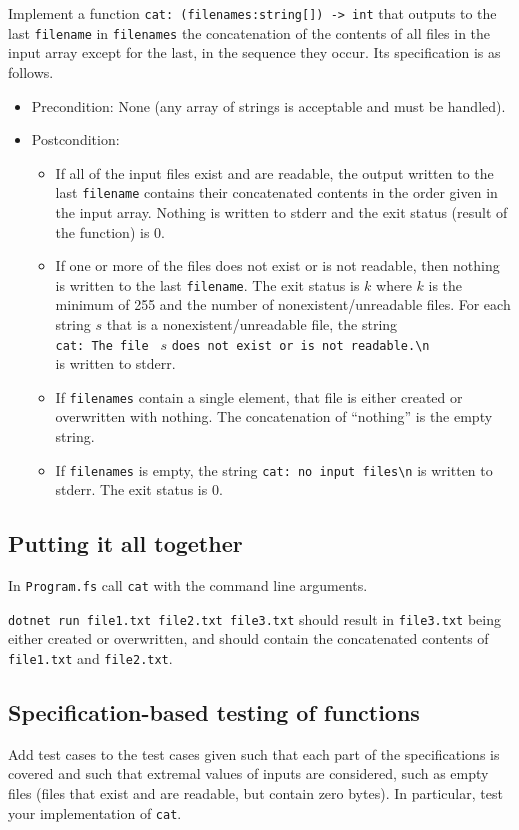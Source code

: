 Implement a function \texttt{cat: (filenames:string[]) -> int} that outputs to the last \texttt{filename} in \texttt{filenames} the concatenation of the contents of all files in the input array except for the last, in the sequence they occur. Its specification is as follows.
\begin{itemize}
\item Precondition: None (any array of strings is acceptable and must be handled).
\item Postcondition: 
\begin{itemize}
\item If all of the input files exist and are readable, the output written to the last \texttt{filename} contains their concatenated contents in the order given in the input array. Nothing is written to stderr and the exit status (result of the function) is $0$.
\item If one or more of the files does not exist or is not readable, then
  nothing is written to the last \texttt{filename}. The exit status is $k$ where $k$ is the minimum of 255 and the number of nonexistent/unreadable files. For each string $s$ that is a nonexistent/unreadable file, the string \\ \verb|cat: The file | $s$ \verb|does not exist or is not readable.\n| \\ is written to stderr.
\item If \texttt{filenames} contain a single element, that file is either created or overwritten with nothing. The concatenation of ``nothing'' is the empty string.
  \item If \texttt{filenames} is empty, the string \verb|cat: no input files\n| is written to stderr. The exit status is 0. 
\end{itemize}
\end{itemize} 

\subsection*{Putting it all together}

In \texttt{Program.fs} call \texttt{cat} with the command line arguments.

\texttt{dotnet run file1.txt file2.txt file3.txt} should result in \texttt{file3.txt} being either created or overwritten, and should contain the concatenated contents of \texttt{file1.txt} and \texttt{file2.txt}.

\subsection*{Specification-based testing of functions}

Add test cases to the test cases given %
such that each part of the specifications is covered and such that  extremal values of inputs are considered, such as empty files (files that exist and are readable, but contain zero bytes).   In particular, test your implementation of \texttt{cat}.
